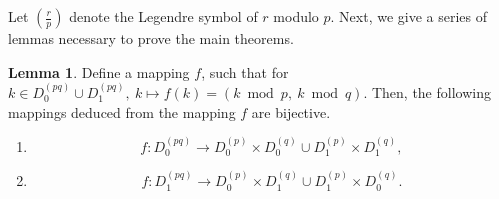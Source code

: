 \documentclass{mcom-l}
\theoremstyle{definition}
\newtheorem{sec3lemma1}{Lemma}[section]
\numberwithin{equation}{section}
\begin{document}
         Let $\left(\tfrac{r}{p}\right)  $ denote the Legendre symbol of $ r $ modulo $ p $. Next, we give a series of lemmas necessary to prove the  main theorems.
            \begin{sec3lemma1}\label{lab_sec3_lemma1}
            Define a mapping $ f $, such that for $ k\in D_{0}^{(pq)}\cup D_{1}^{(pq)},\  k\mapsto f(k)=(k\bmod p,\ k\bmod q) $. Then, the following mappings deduced from the mapping $ f $ are bijective.
            \begin{enumerate} \item
            \begin{equation*}
            f:D_{0}^{(pq)}\rightarrow D_{0}^{(p)}\times D_{0}^{(q)}\cup D_{1}^{(p)}\times D_{1}^{(q)},
            \end{equation*}
            \item
            \begin{equation*}
            f:D_{1}^{(pq)}\rightarrow D_{0}^{(p)}\times D_{1}^{(q)}\cup D_{1}^{(p)}\times D_{0}^{(q)}.
            \end{equation*}
            \end{enumerate}
            \end{sec3lemma1}
\end{document}
